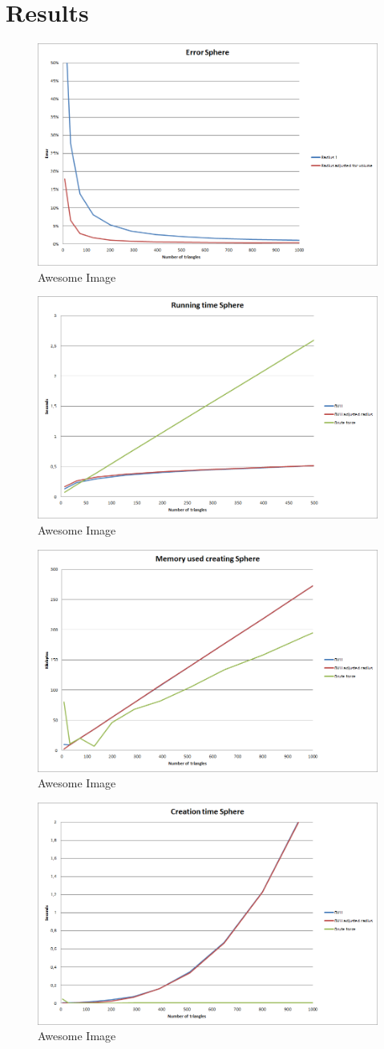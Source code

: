 \documentclass[11pt,twoside,a4paper]{report}
\begin{document}
\chapter{Results}
\begin{figure}[h] \centering \includegraphics[width=0.45\linewidth]{images/chart_sphere_error}
    \caption{Awesome Image} \label{fig:awesome_image1} \end{figure}
\begin{figure}[h] \centering \includegraphics[width=0.45\linewidth]{images/chart_sphere_running_time}
    \caption{Awesome Image} \label{fig:awesome_image1} \end{figure}
\begin{figure}[h] \centering \includegraphics[width=0.45\linewidth]{images/chart_sphere_creation_memory}
    \caption{Awesome Image} \label{fig:awesome_image1} \end{figure}
\begin{figure}[h] \centering \includegraphics[width=0.45\linewidth]{images/chart_sphere_creation_time}
    \caption{Awesome Image} \label{fig:awesome_image1} \end{figure}
\end{document}
